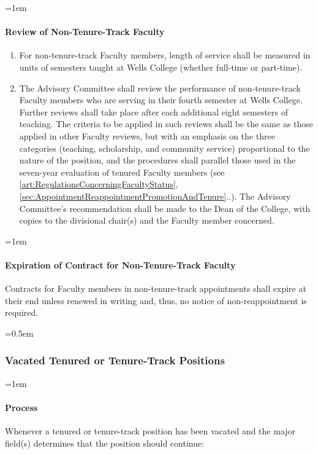 \documentclass{manual}
\let\oldsubsubsection\subsubsection
\renewcommand\subsubsection{\leftskip=0.5em\oldsubsubsection}
\let\oldparagraph\paragraph
\renewcommand\paragraph{\leftskip=1em\oldparagraph}
\newcommand{\itemLevelA}{\alph*.}
\newcommand{\itemRefA}{\alph*}
\begin{document}
\paragraph{Review of Non-Tenure-Track Faculty}\label{par:ReviewOfPartTimeVisitingAndOtherNonTenureTrackOfficersOfInstruction}
\begin{enumerate}[label=\itemLevelA,ref=\itemRefA]
\item For non-tenure-track Faculty members, length of service shall be measured in units of semesters taught at Wells College (whether full-time or part-time).

\item The Advisory Committee shall review the performance of non-tenure-track Faculty members who are serving in their fourth semester at Wells College. Further reviews shall take place after each additional eight semesters of teaching. The criteria to be applied in such reviews shall be the same as those applied in other Faculty reviews, but with an emphasis on the three categories (teaching, scholarship, and community service) proportional to the nature of the position, and the procedures shall parallel those used in the seven-year evaluation of tenured Faculty members (see \cref{art:RegulationsConcerningFacultyStatus}, \cref{sec:AppointmentReappointmentPromotionAndTenure}..). The Advisory Committee's recommendation shall be made to the Dean of the College, with copies to the divisional chair(s) and the Faculty member concerned.
\end{enumerate}
\paragraph{Expiration of Contract for Non-Tenure-Track Faculty}
Contracts for Faculty members in non-tenure-track appointments shall expire at their end unless renewed in writing and, thus, no notice of non-reappointment is required.


\subsubsection{Vacated Tenured or Tenure-Track Positions}

\paragraph{Process}

Whenever a tenured or tenure-track position has been vacated and the major field(s) determines that the position should continue:
\end{document}
